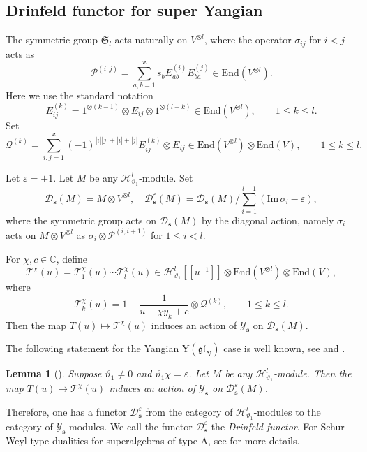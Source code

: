 \documentclass[11pt,reqno]{amsart}
\numberwithin{equation}{section}
\newtheorem{lem}[thm]{Lemma}
\theoremstyle{definition}
\theoremstyle{remark}
\newcommand{\beq}{\begin{equation}}
\newcommand{\eeq}{\end{equation}}
\newcommand{\mc}{\mathcal}
\newcommand{\gl}{\mathfrak{gl}}
\newcommand{\End}{\mathrm{End}}
\newcommand{\bC}{\mathbb{C}}
\newcommand{\lle}{\leqslant}
\newcommand{\YMN}{{\mathscr{Y}_{\bm s}}}
\newcommand{\ka}{\varkappa}
\newcommand{\ve}{\varepsilon}
\newcommand{\s}{{\bm s}}
\begin{document}
\subsection{Drinfeld functor for super Yangian}
The symmetric group $\mathfrak S_l$ acts naturally on $V^{\otimes l}$, where the operator $\sigma_{ij}$ for $i<j$ acts as
\beq\label{eq perm}
\mathcal P^{(i,j)}=\sum_{a,b=1}^\ka s_b E_{ab}^{(i)}E_{ba}^{(j)}\in \End(V^{\otimes l}).
\eeq
Here we use the standard notation
\[
E_{ij}^{(k)}=1^{\otimes (k-1)}\otimes E_{ij}\otimes 1^{\otimes (l -k)}\in \End(V^{\otimes l}),\qquad 1\lle k\lle l.
\]
Set
$$
\mc Q^{(k)}=\sum_{i,j=1}^\ka (-1)^{|i||j|+|i|+|j|}E_{ij}^{(k)}\otimes E_{ij}\in \End(V^{\otimes l})\otimes \End(V),\qquad 1\lle k\lle l.
$$

Let $\ve=\pm 1$. Let $M$ be any $\mathscr H_{\vartheta_1}^l$-module. Set
\[
\mc D_\s(M)=M\otimes V^{\otimes l},\quad \mc D_{\s}^{\ve}(M)=\mc D_{\s}(M)/\sum_{i=1}^{l-1}(\mathrm{Im}\, \sigma_i-\ve),
\]
where the symmetric group acts on $\mc D_\s(M)$ by the diagonal action, namely $\sigma_i$ acts on $M\otimes V^{\otimes l}$ as $\sigma_i\otimes \mc P^{(i,i+1)}$ for $1\lle i<l$.

For $\chi,c\in\bC$, define
\[
\mathcal T^{\chi}(u)=\mc T_1^\chi(u)\cdots \mc T^{\chi}_l(u)\in \mathscr H_{\vartheta_1}^l[[u^{-1}]]\otimes \End(V^{\otimes l})\otimes \End(V),
\]
where
\[
\mc T_k^\chi(u)=1+\frac{1}{u-\chi y_k+c}\otimes \mc Q^{(k)},\qquad 1\lle k \lle l.
\]
Then the map $T(u)\mapsto \mc T^{\chi}(u)$ induces an action of $\YMN$ on $\mc D_\s(M)$.

The following statement for the Yangian $\mathrm{Y}(\gl_N)$ case  is well known, see \cite[Proposition 2]{Arakawa1999} and \cite[Theorem 1]{Drinfeld198degenerate}.
\begin{lem}[{\cite[Lemma 4.2]{Lu2021jacobi}}]\label{lem:D-functor-A}
Suppose $\vartheta_1\ne 0$ and $\vartheta_1 \chi=\ve$. Let $M$ be any $\mathscr H_{\vartheta_1}^l$-module. Then the map $T(u)\mapsto \mc T^{\chi}(u)$ induces an action of $\YMN$ on $\mc D_\s^\ve(M)$.
\end{lem}

Therefore, one has a functor $\mc D_\s^\ve$ from the category of $\mathscr H_{\vartheta_1}^l$-modules to the category of $\YMN$-modules. We call the functor $\mc D_\s^\ve$ the {\it Drinfeld functor}. For Schur-Weyl type dualities for superalgebras of type A, see \cite{Sergeev1984tensor,Berele1987hook,Moon2003highest,Mitsuhashi2006schur,Flicker2020affine,Lu2021jacobi,Lu2021gelfand,Kwon2022super,Lu2023schur,Guay2024affine,Shen2025quantum} for more details.
\end{document}
